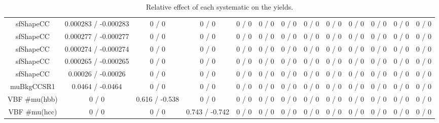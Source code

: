 \documentclass[10pt]{article}
\begin{document}
\begin{table}[htbp]
\begin{center}
\begin{tabular}{|c|c|c|c|c|c|c|c|c|c|c|c|c|}
  sfShapeCC & 0.000283 / -0.000283 & 0 / 0 & 0 / 0 & 0 / 0 & 0 / 0 & 0 / 0 & 0 / 0 & 0 / 0 & 0 / 0 & 0 / 0 & 0 / 0 & 0 / 0 \\ 
  sfShapeCC & 0.000277 / -0.000277 & 0 / 0 & 0 / 0 & 0 / 0 & 0 / 0 & 0 / 0 & 0 / 0 & 0 / 0 & 0 / 0 & 0 / 0 & 0 / 0 & 0 / 0 \\ 
  sfShapeCC & 0.000274 / -0.000274 & 0 / 0 & 0 / 0 & 0 / 0 & 0 / 0 & 0 / 0 & 0 / 0 & 0 / 0 & 0 / 0 & 0 / 0 & 0 / 0 & 0 / 0 \\ 
  sfShapeCC & 0.000265 / -0.000265 & 0 / 0 & 0 / 0 & 0 / 0 & 0 / 0 & 0 / 0 & 0 / 0 & 0 / 0 & 0 / 0 & 0 / 0 & 0 / 0 & 0 / 0 \\ 
  sfShapeCC & 0.00026 / -0.00026 & 0 / 0 & 0 / 0 & 0 / 0 & 0 / 0 & 0 / 0 & 0 / 0 & 0 / 0 & 0 / 0 & 0 / 0 & 0 / 0 & 0 / 0 \\ 
  muBkgCCSR1 & 0.0464 / -0.0464 & 0 / 0 & 0 / 0 & 0 / 0 & 0 / 0 & 0 / 0 & 0 / 0 & 0 / 0 & 0 / 0 & 0 / 0 & 0 / 0 & 0 / 0 \\ 
  VBF #mu(hbb) & 0 / 0 & 0.616 / -0.538 & 0 / 0 & 0 / 0 & 0 / 0 & 0 / 0 & 0 / 0 & 0 / 0 & 0 / 0 & 0 / 0 & 0 / 0 & 0 / 0 \\ 
  VBF #mu(hcc) & 0 / 0 & 0 / 0 & 0.743 / -0.742 & 0 / 0 & 0 / 0 & 0 / 0 & 0 / 0 & 0 / 0 & 0 / 0 & 0 / 0 & 0 / 0 & 0 / 0 \\ 
\hline 
\end{tabular} 
\caption{Relative effect of each systematic on the yields.} 
\end{center} 
\end{table} 
\end{document}
